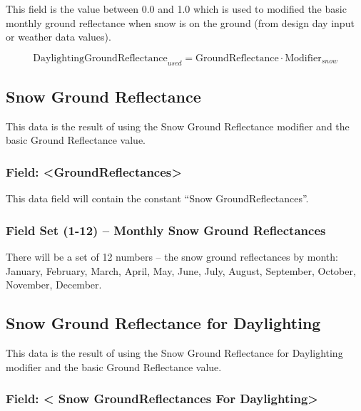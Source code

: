 This field is the value between 0.0 and 1.0 which is used to modified the basic monthly ground reflectance when snow is on the ground (from design day input or weather data values).

\begin{equation}
\text{DaylightingGroundReflectance}_{used} = \text{GroundReflectance} \cdot \text{Modifier}_{snow}
\end{equation}

\subsection{Snow Ground Reflectance}\label{snow-ground-reflectance}

This data is the result of using the Snow Ground Reflectance modifier and the basic Ground Reflectance value.

\subsubsection{Field: \textless{}GroundReflectances\textgreater{}}\label{field-groundreflectances-1}

This data field will contain the constant ``Snow GroundReflectances''.

\subsubsection{Field Set (1-12) -- Monthly Snow Ground Reflectances}\label{field-set-1-12-monthly-snow-ground-reflectances}

There will be a set of 12 numbers -- the snow ground reflectances by month: January, February, March, April, May, June, July, August, September, October, November, December.

\subsection{Snow Ground Reflectance for Daylighting}\label{snow-ground-reflectance-for-daylighting}

This data is the result of using the Snow Ground Reflectance for Daylighting modifier and the basic Ground Reflectance value.

\subsubsection{Field: \textless{} Snow GroundReflectances For Daylighting\textgreater{}}\label{field-snow-groundreflectances-for-daylighting}

